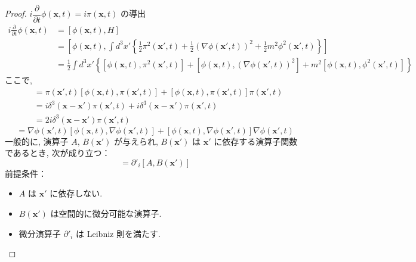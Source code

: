 \documentclass[a4paper,12pt]{article}
\begin{document}
\color{blue}
\begin{proof}
$i \dfrac{\partial}{\partial t} \phi(\mathbf{x}, t) = i \pi(\mathbf{x}, t)$ の導出
\begin{align*}
i \frac{\partial}{\partial t} \phi(\mathbf{x}, t) &= \left[ \phi(\mathbf{x}, t), H \right] \tag{2-4.a1}\\
&= \left[\phi(\mathbf{x}, t), \int d^3 x' \left\{ \frac{1}{2} \pi^2 (\mathbf{x}', t) + \frac{1}{2}(\nabla \phi(\mathbf{x}', t))^2 + \frac{1}{2}m^2 \phi^2(\mathbf{x}', t) \right\}\right] \tag{2-4.a2}\\
&= \frac{1}{2}\int d^3 x' \left\{ [\phi(\mathbf{x}, t), \pi^2 (\mathbf{x}', t)] + [\phi(\mathbf{x}, t), (\nabla \phi(\mathbf{x}', t))^2] + m^2 [\phi(\mathbf{x}, t), \phi^2(\mathbf{x}', t)] \right\} \label{2-4.a3}\tag{2-4.a3}
\end{align*}
ここで,
\begin{align*}
  [\phi(\mathbf{x}, t), \pi^2 (\mathbf{x}', t)] &= \pi(\mathbf{x}', t) \left[ \phi(\mathbf{x}, t), \pi(\mathbf{x}', t) \right] + \left[ \phi(\mathbf{x}, t), \pi(\mathbf{x}', t) \right] \pi(\mathbf{x}', t) \tag{2-4.a4}\\
  &= i \delta^3(\mathbf{x} - \mathbf{x}') \pi(\mathbf{x}', t) + i \delta^3(\mathbf{x} - \mathbf{x}') \pi(\mathbf{x}', t) \tag{2-4.a5}\\
  &= 2i \delta^3(\mathbf{x} - \mathbf{x}') \pi(\mathbf{x}', t) \tag{2-4.a6}
\end{align*}
\begin{equation*}
  [\phi(\mathbf{x}, t), (\nabla \phi(\mathbf{x}', t))^2] = \nabla \phi(\mathbf{x}', t) \left[ \phi(\mathbf{x}, t), \nabla \phi(\mathbf{x}', t) \right] + \left[ \phi(\mathbf{x}, t), \nabla \phi(\mathbf{x}', t) \right] \nabla \phi(\mathbf{x}', t) \tag{2-4.a7}
\end{equation*}
一般的に, 演算子 $A$, $B(\mathbf{x}')$ が与えられ, $B(\mathbf{x}')$ は $\mathbf{x}'$ に依存する演算子関数であるとき, 次が成り立つ：
\begin{equation*}
  [A, \partial'_i B(\mathbf{x}')] = \partial'_i [A, B(\mathbf{x}')] \label{2-4.a8}\tag{2-4.a8}
\end{equation*}
前提条件：
\begin{itemize}
  \item $A$ は $\mathbf{x}'$ に依存しない.
  \item $B(\mathbf{x}')$ は空間的に微分可能な演算子.
  \item 微分演算子 $\partial'_i$ は Leibniz 則を満たす.
\end{itemize}

\end{proof}
\end{document}
